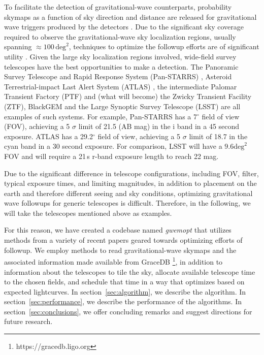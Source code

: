\documentclass[twocolumn]{aastex61}
\begin{document}
To facilitate the detection of gravitational-wave counterparts, probability skymaps as a function of sky direction and distance are released for gravitational wave triggers produced by the detectors \citep{SiPr2014,BeMa2015}. 
Due to the significant sky coverage required to observe the gravitational-wave sky localization regions, usually spanning $\approx 100\,\textrm{deg}^2$, techniques to optimize the followup efforts are of significant utility \citep{Fair2009,Fair2011,Grover:2013,WeCh2010,SiAy2014,SiPr2014,BeMa2015,EsVi2015,CoLi2015,KlVe2016}.
Given the large sky localization regions involved, wide-field survey telescopes have the best opportunities to make a detection. 
The Panoramic Survey Telescope and Rapid Response System (Pan-STARRS) \citep{MoKa2012}, Asteroid Terrestrial-impact Last Alert System (ATLAS) \citep{Ton2011}, the intermediate Palomar Transient Factory (PTF) \citep{RaSh2009} and (what will become) the Zwicky Transient Facility (ZTF), BlackGEM \citep{BlGr2015} and the Large Synoptic Survey Telescope (LSST) \citep{Ivezic2014} are all examples of such systems.
For example, Pan-STARRS has a 7$^\circ$ field of view (FOV), achieving a 5 $\sigma$ limit of 21.5 (AB mag) in the i band in a 45 second exposure. ATLAS has a 29.2$^\circ$ field of view, achieving a 5 $\sigma$ limit of 18.7 in the cyan band in a 30 second exposure. For comparison, LSST will have a $9.6\textrm{deg}^2$ FOV and will require a 21\,s r-band exposure length to reach 22 mag.

Due to the significant difference in telescope configurations, including FOV, filter, typical exposure times, and limiting magnitudes, in addition to placement on the earth and therefore different seeing and sky conditions, optimizing gravitational wave followups for generic telescopes is difficult. Therefore, in the following, we will take the telescopes mentioned above as examples. 

For this reason, we have created a codebase named \emph{gwemopt} that utilizes methods from a variety of recent papers geared towards optimizing efforts of followup. We employ methods to read gravitational-wave skymaps and the associated information made available from GraceDB \footnote{https://gracedb.ligo.org}, in addition to information about the telescopes to tile the sky, allocate available telescope time to the chosen fields, and schedule that time in a way that optimizes based on expected lightcurves.
In section~\ref{sec:algorithm}, we describe the algorithm.
In section~\ref{sec:performance}, we describe the performance of the algorithms.
In section~\ref{sec:conclusions}, we offer concluding remarks and suggest directions for future research.
\end{document}
